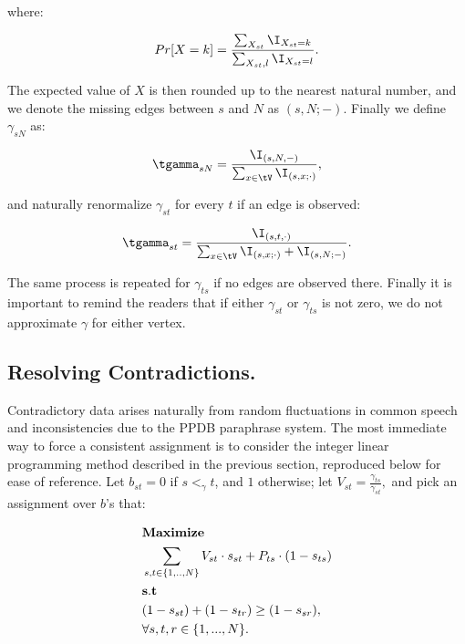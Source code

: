 where:

\begin{equation}
	Pr[X = k] = \frac{  \sum_{X_{st}} \I_{X_{st} = k}  }{\sum_{X_{st}, l} \I_{X_{st} = l}}.
\end{equation}

The expected value of $X$ is then rounded up to the nearest natural number, and we denote the missing edges between $s$ and $N$ as $(s, N; -).$  Finally we define $\gamma_{sN}$ as:

\begin{equation}
	\tgamma_{sN} = \frac{\I_{(s,N,-)}}{\sum_{x \in \tV} \I_{(s,x; \cdot)}},
\end{equation}

and naturally renormalize $\gamma_{st}$ for every $t$ if an edge is observed:

\begin{equation}
	\tgamma_{st} = \frac{\I_{(s,t,\cdot)}}{\sum_{x \in \tV} \I_{(s,x; \cdot)} + \I_{(s, N; -)}}.
\end{equation}

The same process is repeated for $\gamma_{ts}$ if no edges are observed there. Finally it is important to remind the readers that if either $\gamma_{st}$ or $\gamma_{ts}$ is not zero, we do not approximate $\gamma$ for either vertex. 

\subsection{Resolving Contradictions.}

Contradictory data arises naturally from random fluctuations in common speech and inconsistencies due to the PPDB paraphrase system. The most immediate way to force a consistent assignment is to consider the integer linear programming method described in the previous section, reproduced below for ease of reference. Let $b_{st} = 0$ if $s <_{\gamma} t$, and $1$ otherwise; let $V_{st} = \frac{\gamma_{ts}}{\gamma_{st}},$ and pick an assignment over $b$'s that:

\begin{align*}
  &{\bf Maximize}\\
  &\sum_{s,t \in \{1,..,N\}} V_{st} \cdot s_{st} + P_{ts} \cdot (1 - s_{ts}) \\
  &{\bf s.t}\\
  &(1 - s_{st}) + (1 - s_{tr}) \geq (1 - s_{sr}),  \\
  &\forall s,t,r \in \{1,...,N\}.\\
\end{align*}


